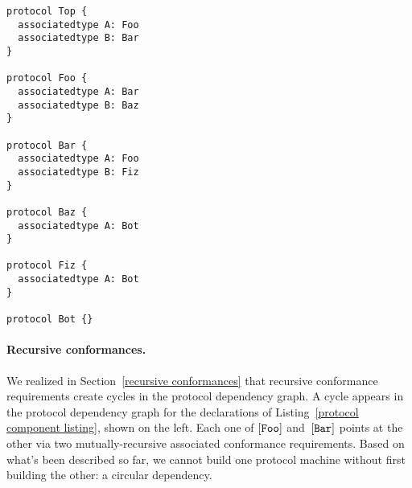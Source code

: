\documentclass[../generics]{subfiles}
\begin{document}
\begin{listing}\label{protocol component listing}
\begin{Verbatim}
protocol Top {
  associatedtype A: Foo
  associatedtype B: Bar
}

protocol Foo {
  associatedtype A: Bar
  associatedtype B: Baz
}

protocol Bar {
  associatedtype A: Foo
  associatedtype B: Fiz
}

protocol Baz {
  associatedtype A: Bot
}

protocol Fiz {
  associatedtype A: Bot
}

protocol Bot {}
\end{Verbatim}
\end{listing}

\begin{wrapfigure}[12]{r}{3.6cm}
\end{wrapfigure}

\paragraph{Recursive conformances.}
We realized in Section~\ref{recursive conformances} that recursive conformance requirements create cycles in the protocol dependency graph. A cycle appears in the protocol dependency graph for the declarations of Listing~\ref{protocol component listing}, shown on the left. Each one of $[\texttt{Foo}]$ and~$[\texttt{Bar}]$ points at the other via two mutually-recursive associated conformance requirements. Based on what's been described so far, we cannot build one protocol machine without first building the other: a circular dependency.
\end{document}
